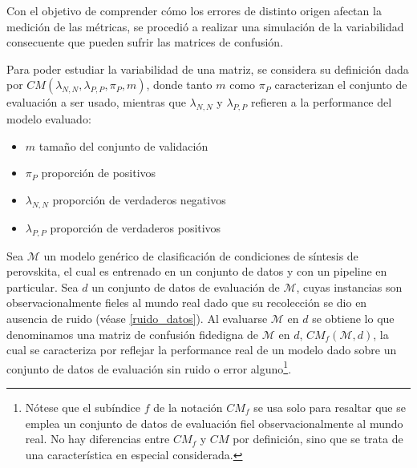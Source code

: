 
Con el objetivo de comprender cómo los errores de distinto origen afectan la medición de las métricas, se procedió a realizar una simulación de la variabilidad consecuente que pueden sufrir las matrices de confusión. 



Para poder estudiar la variabilidad de una matriz, se considera su definición dada por $CM(\lambda_{N,N}, \lambda_{P,P}, \pi_{P}, m)$, donde tanto $m$ como $\pi_{P}$ caracterizan el conjunto de evaluación a ser usado, mientras que $\lambda_{N,N}$ y $\lambda_{P,P}$ refieren a la performance del modelo evaluado:

\begin{itemize}
    \item $m$ tamaño del conjunto de validación
    \item $\pi_{P}$ proporción de positivos 
    \item $\lambda_{N,N}$ proporción de verdaderos negativos
    \item $\lambda_{P,P}$ proporción de verdaderos positivos
\end{itemize}

Sea $\mathcal{M}$ un modelo genérico de clasificación de condiciones de síntesis de perovskita, el cual es entrenado en un conjunto de datos y con un pipeline en particular. Sea $d$ un conjunto de datos de evaluación de $\mathcal{M}$, cuyas instancias son observacionalmente fieles al mundo real dado que su recolección se dio en ausencia de ruido (véase \ref{ruido_datos}). Al evaluarse $\mathcal{M}$ en $d$ se obtiene lo que denominamos una matriz de confusión fidedigna de  $\mathcal{M}$ en $d$, $CM_f(\mathcal{M}, d)$, la cual se caracteriza por reflejar la performance real de un modelo dado sobre un conjunto de datos de evaluación sin ruido o error alguno\footnote{Nótese que el subíndice $f$ de la notación $CM_{f}$ se usa solo para resaltar que se emplea un conjunto de datos de evaluación fiel observacionalmente al mundo real. No hay diferencias entre $CM_{f}$ y $CM$ por definición, sino que se trata de una característica en especial considerada.}. 

